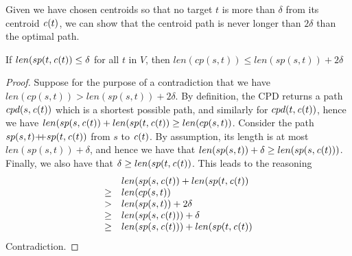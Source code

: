 Given we have chosen centroids so that no target $t$ is more than $\delta$ from its centroid $\mathit{c}(t)$, we can show that the 
centroid path is never longer than $2\delta$ than the optimal path.

\begin{theorem}\label{thm:centroid}
If $len(sp(t,\mathit{c}(t)) \leq \delta$ for all $t$ in $V$, then 
$len(cp(s,t)) \leq len(sp(s,t)) + 2\delta$
\end{theorem}
\begin{proof}
Suppose for the purpose of a contradiction that we have 
\mbox{$len(cp(s,t)) > len(sp(s,t)) + 2\delta$}.
By definition, the CPD returns a path $cpd(s,\mathit{c}(t))$ which is
a shortest possible path, and similarly for $cpd(t,\mathit{c}(t))$, hence
we have \mbox{$len(sp(s,\mathit{c}(t)) + len(sp(t,\mathit{c}(t)) \geq len(cp(s,t))$}.
Consider the path $sp(s,t) \mbox{+\!\!+}{} sp(t,\mathit{c}(t))$
from $s$ to $\mathit{c}(t)$.
By assumption, its length is at most $len(sp(s,t)) + \delta$, and hence we have that
\mbox{$len(sp(s,t)) + \delta \geq len(sp(s,\mathit{c}(t)))$}.
Finally, we also have that \mbox{$\delta \geq len(sp(t,\mathit{c}(t))$}.
This leads to the reasoning
$$
\begin{array}{cl}
  & len(sp(s,\mathit{c}(t)) + len(sp(t,\mathit{c}(t)) \\
\geq & len(cp(s,t))  \\
> & len(sp(s,t)) + 2\delta  \\
\geq & len(sp(s,\mathit{c}(t))) + \delta \\
\geq & len(sp(s,\mathit{c}(t))) + len(sp(t,\mathit{c}(t)) 
\end{array}
$$
Contradiction.
\end{proof}

